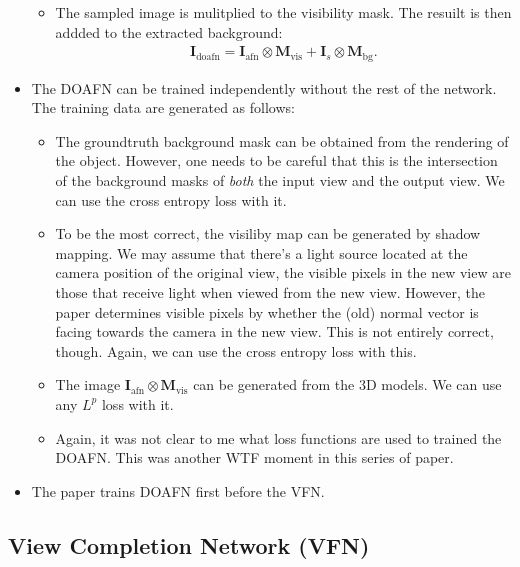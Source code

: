 \documentclass[10pt]{article}
\newcommand{\ve}[1]{\pmb{#1}}
\newcommand{\mrm}[1]{\mathrm{#1}}
\begin{document}
\begin{itemize}
\begin{itemize}
  		\item The sampled image is mulitplied to the visibility mask. The resuilt is then addded to the extracted background:
  		\begin{align*}
  			\ve{I}_{\mrm{doafn}} = \ve{I}_{\mrm{afn}} \otimes \ve{M}_{\mrm{vis}} + \ve{I}_s \otimes \ve{M}_{\mrm{bg}}.
  		\end{align*}
  	\end{itemize}

  	\item The DOAFN can be trained independently without the rest of the network. The training data are generated as follows:
  	\begin{itemize}
  		\item The groundtruth background mask can be obtained from the rendering of the object. However, one needs to be careful that this is the intersection of the background masks of \emph{both} the input view and the output view. We can use the cross entropy loss with it.

  		\item To be the most correct, the visiliby map can be generated by shadow mapping. We may assume that there's a light source located at the camera position of the original view, the visible pixels in the new view are those that receive light when viewed from the new view. However, the paper determines visible pixels by whether the (old) normal vector is facing towards the camera in the new view. This is not entirely correct, though. Again, we can use the cross entropy loss with this.

  		\item The image $\ve{I}_{\mrm{afn}} \otimes \ve{M}_{\mrm{vis}}$ can be generated from the 3D models. We can use any $L^p$ loss with it.

  		\item Again, it was not clear to me what loss functions are used to trained the DOAFN. This was another WTF moment in this series of paper.
  	\end{itemize}

  	\item The paper trains DOAFN first before the VFN.
  \end{itemize}

  \subsection{View Completion Network (VFN)}
\end{document}
